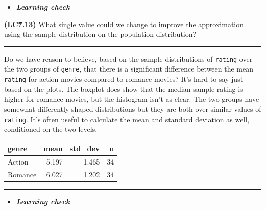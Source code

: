 \documentclass[]{tufte-book}
\newenvironment{Shaded}{\begin{snugshade}}{\end{snugshade}}
\newcommand{\KeywordTok}[1]{\textcolor[rgb]{0.13,0.29,0.53}{\textbf{{#1}}}}
\newcommand{\DataTypeTok}[1]{\textcolor[rgb]{0.13,0.29,0.53}{{#1}}}
\newcommand{\StringTok}[1]{\textcolor[rgb]{0.31,0.60,0.02}{{#1}}}
\newcommand{\NormalTok}[1]{{#1}}
\let\oldrule=\rule
\renewcommand{\rule}[1]{\oldrule{\linewidth}}
\newenvironment{rmdblock}[1]
  {\begin{shaded*}
  \begin{itemize}
  \renewcommand{\labelitemi}{
    \raisebox{-.7\height}[0pt][0pt]{
    }
  }
  \item
  }
  {
  \end{itemize}
  \end{shaded*}
  }
\newenvironment{learncheck}
  {\begin{rmdblock}{warning}}
  {\end{rmdblock}}
\theoremstyle{definition}
\theoremstyle{definition}
\theoremstyle{remark}
\begin{document}
\begin{learncheck}
\textbf{\emph{Learning check}}
\end{learncheck}

\textbf{(LC7.13)} What single value could we change to improve the
approximation using the sample distribution on the population
distribution?

\begin{center}\rule{0.5\linewidth}{\linethickness}\end{center}

Do we have reason to believe, based on the sample distributions of
\texttt{rating} over the two groups of \texttt{genre}, that there is a
significant difference between the mean \texttt{rating} for action
movies compared to romance movies? It's hard to say just based on the
plots. The boxplot does show that the median sample rating is higher for
romance movies, but the histogram isn't as clear. The two groups have
somewhat differently shaped distributions but they are both over similar
values of \texttt{rating}. It's often useful to calculate the mean and
standard deviation as well, conditioned on the two levels.

\begin{Shaded}
\end{Shaded}

\begin{tabular}{l|r|r|r}
\hline
genre & mean & std\_dev & n\\
\hline
Action & 5.197 & 1.465 & 34\\
\hline
Romance & 6.027 & 1.202 & 34\\
\hline
\end{tabular}

\begin{center}\rule{0.5\linewidth}{\linethickness}\end{center}

\begin{learncheck}
\textbf{\emph{Learning check}}
\end{learncheck}
\end{document}
